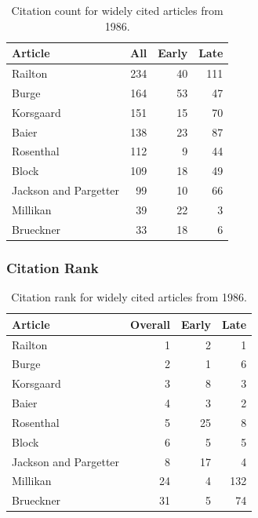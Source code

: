 \documentclass[
  10pt,
  letterpaper,
  DIV=11,
  numbers=noendperiod,
  twoside]{scrartcl}
\begin{document}
\begin{longtable}[]{@{}lrrr@{}}

\caption{\label{tbl-citation-count-1986}Citation count for widely cited
articles from 1986.}

\tabularnewline

\toprule\noalign{}
Article & All & Early & Late \\
\midrule\noalign{}
\endhead
\bottomrule\noalign{}
\endlastfoot
Railton & 234 & 40 & 111 \\
Burge & 164 & 53 & 47 \\
Korsgaard & 151 & 15 & 70 \\
Baier & 138 & 23 & 87 \\
Rosenthal & 112 & 9 & 44 \\
Block & 109 & 18 & 49 \\
Jackson and Pargetter & 99 & 10 & 66 \\
Millikan & 39 & 22 & 3 \\
Brueckner & 33 & 18 & 6 \\

\end{longtable}

\subsubsection*{Citation Rank}\label{citation-rank-10}

\begin{longtable}[]{@{}lrrr@{}}

\caption{\label{tbl-citation-rank-1986}Citation rank for widely cited
articles from 1986.}

\tabularnewline

\toprule\noalign{}
Article & Overall & Early & Late \\
\midrule\noalign{}
\endhead
\bottomrule\noalign{}
\endlastfoot
Railton & 1 & 2 & 1 \\
Burge & 2 & 1 & 6 \\
Korsgaard & 3 & 8 & 3 \\
Baier & 4 & 3 & 2 \\
Rosenthal & 5 & 25 & 8 \\
Block & 6 & 5 & 5 \\
Jackson and Pargetter & 8 & 17 & 4 \\
Millikan & 24 & 4 & 132 \\
Brueckner & 31 & 5 & 74 \\

\end{longtable}
\end{document}
